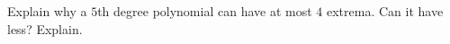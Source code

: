 \begin{ProblemSection}

  \begin{embeddedproblem}{}
    Explain why a $5$th degree polynomial can have at most $4$ extrema.
    Can it have less?  Explain.
  \end{embeddedproblem}
\end{ProblemSection}

